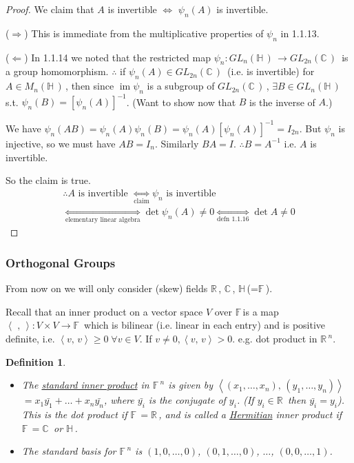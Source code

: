 \documentclass[12pt,a4paper]{article}
\newcommand{\rR}{\ensuremath{\mathbb{R}\,}}
\newcommand{\cC}{\ensuremath{\mathbb{C}\,}}
\newcommand{\hH}{\ensuremath{\mathbb{H}\,}}
\newcommand{\fF}{\ensuremath{\mathbb{F}\,}}
\newcommand{\mnh}{\ensuremath{M_n(\hH)\,}}
\newcommand{\glnh}{\ensuremath{GL_n(\hH)\,}}
\newcommand{\glc}[1]{\ensuremath{GL_{#1}(\cC)\,}}
\newcommand{\ra}{\ensuremath{\Rightarrow}}
\newcommand{\la}{\ensuremath{\Leftarrow}}
\newcommand{\im}{\ensuremath{\operatorname{im}}}
\newcommand{\ipm}[2]{\ensuremath{\left\langle #1, \, #2 \right\rangle}}
\newtheorem{defn}[thm]{Definition}
\begin{document}
\begin{proof}
We claim that $A$ is invertible $\iff$ $\psi_n(A)$ is invertible.

(\ra) This is immediate from the multiplicative properties of $\psi_n$ in 1.1.13.

(\la) In 1.1.14 we noted that the restricted map $\psi_n:\glnh\to\glc{2n}$ is a group homomorphism. $\therefore$ if $\psi_n(A)\in\glc{2n}$ (i.e. is invertible) for $A\in \mnh$, then since $\im \psi_n$ is a subgroup of $\glc{2n}$, $\exists B\in \glnh$ s.t.  $\psi_n(B)=[\psi_n(A)]^{-1}$. (Want to show now that $B$ is the inverse of $A$.)

We have $\psi_n(AB)=\psi_n(A)\psi_n(B)=\psi_n(A)[\psi_n(A)]^{-1}=I_{2n}$. But $\psi_n$ is injective, so we must have $AB=I_n$. Similarly $BA=I$. $\therefore B=A^{-1}$ i.e. $A$ is invertible.

So the claim is true. 
\begin{gather*}
\therefore A \text{ is invertible } \underset{\text{claim}}{\iff} \psi_n \text{ is invertible } \\ 
\underset{\text{elementary linear algebra}}{\iff} \det \psi_n(A)\neq 0 \underset{\text{defn 1.1.16}}{\iff} \det A \neq 0 
\end{gather*}
\end{proof}

\subsubsection{Orthogonal Groups}

From now on we will only consider (skew) fields \rR, \cC, \hH (=\fF). 

Recall that an inner product on a vector space $V$ over \fF is a map $\ipm{\,\,}{}:V\times V \to\fF$ which is bilinear (i.e. linear in each entry) and is positive definite, i.e. $\ipm{v}{v} \geq 0\; \forall v\in V$. If $v\neq 0, \ipm{v}{v}>0$. e.g. dot product in $\rR^n$.

\begin{defn}
\phantom{x}\\
\begin{itemize}
\item[a] The \underline{standard inner product} in $\fF^n$ is given by $\ipm{(x_1,\ldots,x_n)}{(y_1,\ldots,y_n)}$ $= x_1\bar{y_1}+\ldots + x_n\bar{y_n}$, where $\bar{y_i}$ is the conjugate of $y_i$. (If $y_i\in\rR$ then $\bar{y_i}=y_i$). This is the dot product if $\fF=\rR$, and is called a \underline{Hermitian} inner product if $\fF=\cC$ or \hH.
\item[b] The standard basis for $\fF^n$ is $(1,0,\ldots,0)$, $(0,1,\ldots,0)$, $\ldots $, $(0,0,\ldots,1)$.
\end{itemize}
\end{defn}
\end{document}
